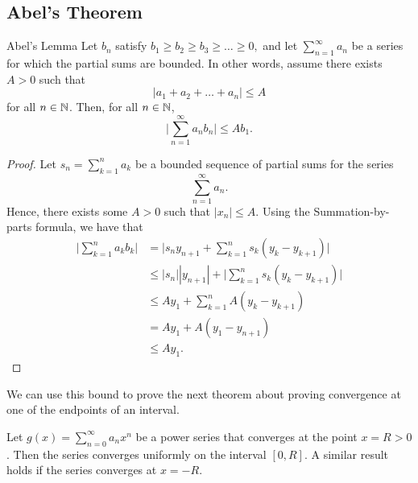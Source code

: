 \subsection{Abel's Theorem}

\begin{lemma}{Abel's Lemma}{}
    Let \( b_n  \) satisfy \( b_1 \geq b_2 \geq b_3 \geq \dots \geq 0,  \) and  let \( \sum_{ n=1 }^{ \infty  } a_n  \) be a series for which the partial sums are bounded. In other words, assume there exists \( A > 0  \) such that 
    \[  | a_1 + a_2 + \dots + a_n  |  \leq A  \] for all \( n \in \mathbb{N}  \). Then, for all \( n \in \mathbb{N}  \), 
    \[  \Big| \sum_{ n=1 }^{ \infty  } a_n b_n  \Big|  \leq Ab_1. \]
    \end{lemma}

\begin{proof}
Let \( s_n = \sum_{ k=1 }^{ n  } a_k  \) be a bounded sequence of partial sums for the series 
\[  \sum_{ n=1  }^{  \infty  } a_n.  \] Hence, there exists some \( A > 0  \) such that \( | x_n  | \leq A  \). Using the Summation-by-parts formula, we have that 
\begin{align*}
    \Big| \sum_{ k=1 }^{ n } a_k b_k  \Big| &= \Big| s_n y_{n+1} + \sum_{ k=1 }^{ n } s_k (y_k - y_{k+1}) \Big|  \\
                                            &\leq | s_n | | y_{n+1} | + \Big| \sum_{ k=1 }^{ n } s_k (y_k - y_{k+1}) \Big| \\
                                            &\leq Ay_1 + \sum_{ k=1 }^{ n } A (y_k - y_{k+1}) \\
                                            &= Ay_1 + A(y_1 - y_{n+1}) \\
                                            &\leq Ay_1.
\end{align*}
\end{proof}

We can use this bound to prove the next theorem about proving convergence at one of the endpoints of an interval.

\begin{theorem}
        Let \( g(x) = \sum_{ n=0  }^{  \infty  } a_n x^n  \) be a power series that converges at the point \( x = R > 0  \). Then the series converges uniformly on the interval \( [0,R] \). A similar result holds if the series converges at \( x = -R  \).
    \end{theorem}

